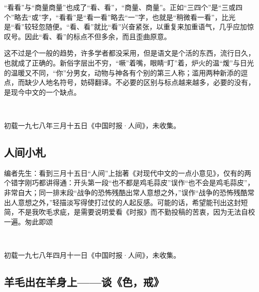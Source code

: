 \par “看看”与“商量商量”也成了“看、看”，“商量、商量”。正如“三四个”是“三或四个”略去“或”字，“看看”是“看一看”略去“一”字，也就是“稍微看一看”，比光是“看”较轻忽随便。“看、看”就比“看”兴奋紧张，以重复来加重语气，几乎应加惊叹号。因此“看、看”的标点不但多余，而且歪曲原意。
\par 这不过是个一般的趋势，许多学者都没采用，但是语文是个活的东西，流行日久，也就成了正确的。新俗字层出不穷，“噘”着嘴，眼睛“盯”着，炉火的温“煖”与日光的温暖又不同，“你”分男女，动物与神各有个别的第三人称；滥用两种新添的逗点，而缺少人地名符号，妨碍翻译。不必要的区别与标点越来越多，必要的没有，是现今中文的一个缺点。
\par  
\par *初载一九七八年三月十五日《中国时报·人间》，未收集。



\subsection{人间小札}


\par 编者先生：看到三月十五日“人间”上拙著《对现代中文的一点小意见》，仅有的两个错字刚巧都讲得通：开头第一段“也不都是鸡毛蒜皮”误作“也不会是鸡毛蒜皮”，非常自大；同一排末段“战争的恐怖残酷出常人意想之外，”误作“战争的恐怖残酷常出人意想之外，”轻描淡写得使打过仗的人起反感。可能的话，希望能刊出这封短简，不是我吹毛求疵，是需要说明爱看《时报》而不勤投稿的苦衷，因为无法自校一遍。匆此即颂
\par {}
\par {}
\par  
\par *初载一九七八年四月十一日《中国时报·人间》，未收集。



\subsection{羊毛出在羊身上——谈《色，戒》}

